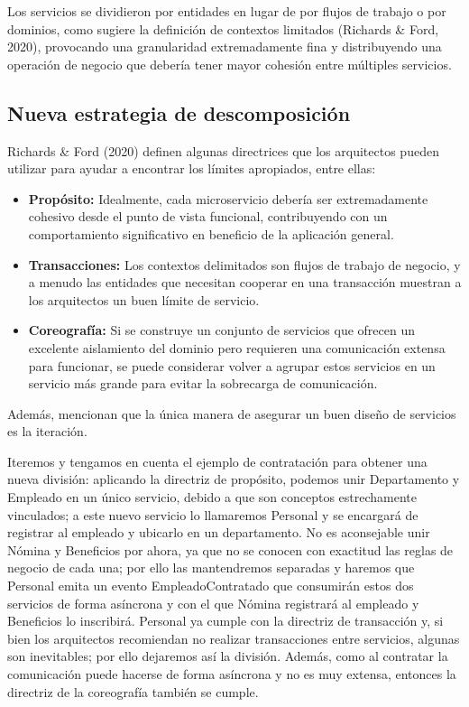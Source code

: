 \documentclass[12pt, a4paper]{article}
\begin{document}
    Los servicios se dividieron por entidades en lugar de por flujos de trabajo o por dominios, como sugiere la definición de contextos limitados (Richards \& Ford, 2020), provocando una granularidad extremadamente fina y distribuyendo una operación de negocio que debería tener mayor cohesión entre múltiples servicios.

    \subsection{Nueva estrategia de descomposición}

    Richards \& Ford (2020) definen algunas directrices que los arquitectos pueden utilizar para ayudar a encontrar los límites apropiados, entre ellas:

    \begin{itemize}
        \item \textbf{Propósito:} Idealmente, cada microservicio debería ser extremadamente cohesivo desde el punto de vista funcional, contribuyendo con un comportamiento significativo en beneficio de la aplicación general.
        \item \textbf{Transacciones:} Los contextos delimitados son flujos de trabajo de negocio, y a menudo las entidades que necesitan cooperar en una transacción muestran a los arquitectos un buen límite de servicio.
        \item \textbf{Coreografía:} Si se construye un conjunto de servicios que ofrecen un excelente aislamiento del dominio pero requieren una comunicación extensa para funcionar, se puede considerar volver a agrupar estos servicios en un servicio más grande para evitar la sobrecarga de comunicación.
    \end{itemize}

    Además, mencionan que la única manera de asegurar un buen diseño de servicios es la iteración.

    Iteremos y tengamos en cuenta el ejemplo de contratación para obtener una nueva división: aplicando la directriz de propósito, podemos unir Departamento y Empleado en un único servicio, debido a que son conceptos estrechamente vinculados; a este nuevo servicio lo llamaremos Personal y se encargará de registrar al empleado y ubicarlo en un departamento. No es aconsejable unir Nómina y Beneficios por ahora, ya que no se conocen con exactitud las reglas de negocio de cada una; por ello las mantendremos separadas y haremos que Personal emita un evento EmpleadoContratado que consumirán estos dos servicios de forma asíncrona y con el que Nómina registrará al empleado y Beneficios lo inscribirá. Personal ya cumple con la directriz de transacción y, si bien los arquitectos recomiendan no realizar transacciones entre servicios, algunas son inevitables; por ello dejaremos así la división. Además, como al contratar la comunicación puede hacerse de forma asíncrona y no es muy extensa, entonces la directriz de la coreografía también se cumple.
\end{document}
